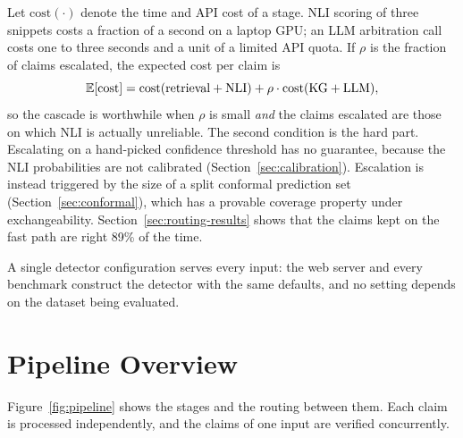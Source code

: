 Let $\text{cost}(\cdot)$ denote the time and API cost of a stage. NLI scoring of three snippets costs a fraction of a second on a laptop GPU; an LLM arbitration call costs one to three seconds and a unit of a limited API quota. If $\rho$ is the fraction of claims escalated, the expected cost per claim is
\begin{equation}
  \mathbb{E}[\text{cost}] = \text{cost}(\text{retrieval} + \text{NLI}) + \rho \cdot \text{cost}(\text{KG} + \text{LLM}),
\end{equation}
so the cascade is worthwhile when $\rho$ is small \emph{and} the claims escalated are those on which NLI is actually unreliable. The second condition is the hard part. Escalating on a hand-picked confidence threshold has no guarantee, because the NLI probabilities are not calibrated (Section~\ref{sec:calibration}). Escalation is instead triggered by the size of a split conformal prediction set (Section~\ref{sec:conformal}), which has a provable coverage property under exchangeability. Section~\ref{sec:routing-results} shows that the claims kept on the fast path are right 89\% of the time.

A single detector configuration serves every input: the web server and every benchmark construct the detector with the same defaults, and no setting depends on the dataset being evaluated.

\section{Pipeline Overview}

Figure~\ref{fig:pipeline} shows the stages and the routing between them. Each claim is processed independently, and the claims of one input are verified concurrently.

